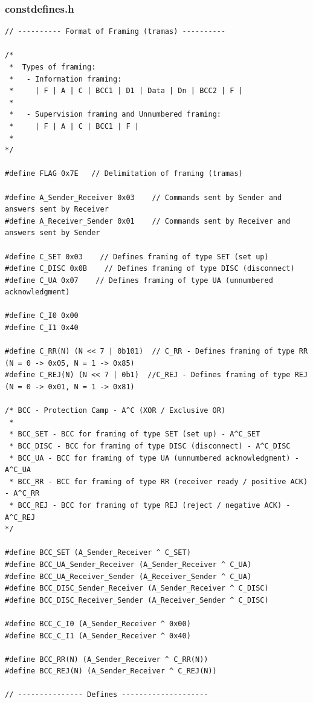 \documentclass[article, a4paper, 11pt, oneside]{memoir}
\begin{document}
\subsubsection{const\textunderscore defines.h}
\begin{lstlisting}
// ---------- Format of Framing (tramas) ----------

/*
 *  Types of framing:
 *   - Information framing:
 *     | F | A | C | BCC1 | D1 | Data | Dn | BCC2 | F |
 *
 *   - Supervision framing and Unnumbered framing:
 *     | F | A | C | BCC1 | F |
 *
*/

#define FLAG 0x7E   // Delimitation of framing (tramas)

#define A_Sender_Receiver 0x03    // Commands sent by Sender and answers sent by Receiver
#define A_Receiver_Sender 0x01    // Commands sent by Receiver and answers sent by Sender

#define C_SET 0x03    // Defines framing of type SET (set up)
#define C_DISC 0x0B    // Defines framing of type DISC (disconnect)
#define C_UA 0x07    // Defines framing of type UA (unnumbered acknowledgment)

#define C_I0 0x00
#define C_I1 0x40

#define C_RR(N) (N << 7 | 0b101)  // C_RR - Defines framing of type RR (N = 0 -> 0x05, N = 1 -> 0x85)
#define C_REJ(N) (N << 7 | 0b1)  //C_REJ - Defines framing of type REJ (N = 0 -> 0x01, N = 1 -> 0x81)

/* BCC - Protection Camp - A^C (XOR / Exclusive OR)
 *
 * BCC_SET - BCC for framing of type SET (set up) - A^C_SET
 * BCC_DISC - BCC for framing of type DISC (disconnect) - A^C_DISC
 * BCC_UA - BCC for framing of type UA (unnumbered acknowledgment) - A^C_UA
 * BCC_RR - BCC for framing of type RR (receiver ready / positive ACK) - A^C_RR
 * BCC_REJ - BCC for framing of type REJ (reject / negative ACK) - A^C_REJ
*/

#define BCC_SET (A_Sender_Receiver ^ C_SET)
#define BCC_UA_Sender_Receiver (A_Sender_Receiver ^ C_UA)
#define BCC_UA_Receiver_Sender (A_Receiver_Sender ^ C_UA)
#define BCC_DISC_Sender_Receiver (A_Sender_Receiver ^ C_DISC)
#define BCC_DISC_Receiver_Sender (A_Receiver_Sender ^ C_DISC)

#define BCC_C_I0 (A_Sender_Receiver ^ 0x00)
#define BCC_C_I1 (A_Sender_Receiver ^ 0x40)

#define BCC_RR(N) (A_Sender_Receiver ^ C_RR(N))
#define BCC_REJ(N) (A_Sender_Receiver ^ C_REJ(N))

// --------------- Defines --------------------


\end{lstlisting}
\end{document}
